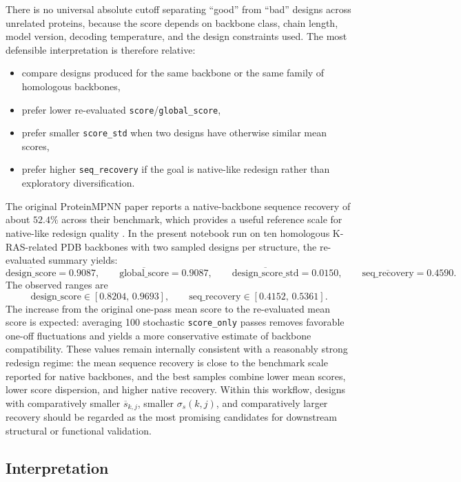 \documentclass[11pt,a4paper]{article}
\begin{document}
There is no universal absolute cutoff separating ``good'' from ``bad'' designs across unrelated proteins, because the score depends on backbone class, chain length, model version, decoding temperature, and the design constraints used. The most defensible interpretation is therefore relative:
\begin{itemize}[leftmargin=*]
\item compare designs produced for the same backbone or the same family of homologous backbones,
\item prefer lower re-evaluated \texttt{score}/\texttt{global\_score},
\item prefer smaller \texttt{score\_std} when two designs have otherwise similar mean scores,
\item prefer higher \texttt{seq\_recovery} if the goal is native-like redesign rather than exploratory diversification.
\end{itemize}

The original ProteinMPNN paper reports a native-backbone sequence recovery of about $52.4\%$ across their benchmark, which provides a useful reference scale for native-like redesign quality \cite{Dauparas2022}. In the present notebook run on ten homologous K-RAS-related PDB backbones with two sampled designs per structure, the re-evaluated summary yields:
\[
\overline{\mathrm{design\_score}} = 0.9087,
\qquad
\overline{\mathrm{global\_score}} = 0.9087,
\qquad
\overline{\mathrm{design\_score\_std}} = 0.0150,
\qquad
\overline{\mathrm{seq\_recovery}} = 0.4590.
\]
The observed ranges are
\[
\mathrm{design\_score}\in[0.8204,\,0.9693],
\qquad
\mathrm{seq\_recovery}\in[0.4152,\,0.5361].
\]
The increase from the original one-pass mean score to the re-evaluated mean score is expected: averaging 100 stochastic \texttt{score\_only} passes removes favorable one-off fluctuations and yields a more conservative estimate of backbone compatibility. These values remain internally consistent with a reasonably strong redesign regime: the mean sequence recovery is close to the benchmark scale reported for native backbones, and the best samples combine lower mean scores, lower score dispersion, and higher native recovery. Within this workflow, designs with comparatively smaller $\overline s_{k,j}$, smaller $\sigma_s(k,j)$, and comparatively larger recovery should be regarded as the most promising candidates for downstream structural or functional validation.

\subsection{Interpretation}
\end{document}
